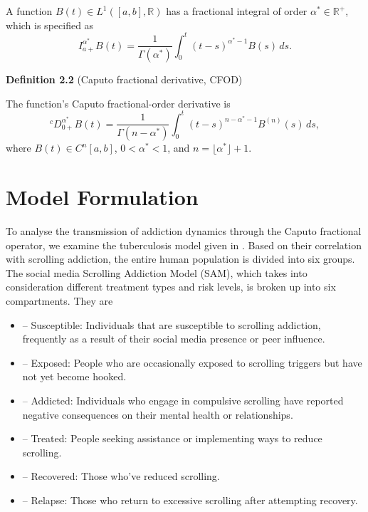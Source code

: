 \documentclass[10pt]{NSP1}
\begin{document}
	A function $B(t) \in L^{1}([a,b],\mathbb{R})$ has a fractional integral of order $\alpha^{\ast} \in \mathbb{R}^{+}$, which is specified as
	\begin{equation}
		I_{a+}^{\alpha^{\ast}} B(t) = \frac{1}{\Gamma(\alpha^{\ast})} \int_{0}^{t} (t-s)^{\alpha^{\ast}-1} B(s) \, ds.
		\tag{2.1}
	\end{equation}
	
	\textbf{Definition 2.2} (Caputo fractional derivative, CFOD)  
	
	The function's Caputo fractional-order derivative is
	\begin{equation}
		{}^{c}D_{0+}^{\alpha^{\ast}} B(t) = \frac{1}{\Gamma(n-\alpha^{\ast})} \int_{0}^{t} (t-s)^{n-\alpha^{\ast}-1} B^{(n)}(s) \, ds,
		\tag{2.2}
	\end{equation}
	where $B(t) \in C^{n}[a,b]$, $0 < \alpha^{\ast} < 1$, and $n = \lfloor \alpha^{\ast} \rfloor + 1$.
	
	\section{Model Formulation}
	
	To analyse the transmission of addiction dynamics through the Caputo fractional operator, we examine the tuberculosis model given in \cite{ref10}. Based on their correlation with scrolling addiction, the entire human population is divided into six groups. The social media Scrolling Addiction Model (SAM), which takes into consideration different treatment types and risk levels, is broken up into six compartments. They are
	
	\begin{itemize}
		\item[$S(t)$] – Susceptible: Individuals that are susceptible to scrolling addiction, frequently as a result of their social media presence or peer influence.
		\item[$E(t)$] – Exposed: People who are occasionally exposed to scrolling triggers but have not yet become hooked.
		\item[$I(t)$] – Addicted: Individuals who engage in compulsive scrolling have reported negative consequences on their mental health or relationships.
		\item[$T(t)$] – Treated: People seeking assistance or implementing ways to reduce scrolling.
		\item[$R(t)$] – Recovered: Those who've reduced scrolling.
		\item[$L(t)$] – Relapse: Those who return to excessive scrolling after attempting recovery.
	\end{itemize}
	
\end{document}
